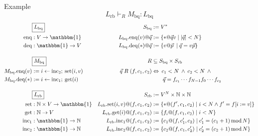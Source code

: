 \documentclass{beamer}
\newcommand{\kw}[1]{\ensuremath{ \mathrm{#1} }}
\begin{document}
\begin{frame}{Example} %
  \vspace{-2em}
  \[ L_\kw{rb} \vdash_R M_\kw{bq} : L_\kw{bq} \]
  \tiny
  \begin{align*}
    & \fbox{$L_\kw{bq}$} &
      S_\kw{bq} &:= V^* \\
    \kw{enq} &: V \rightarrow \mathbbm{1} &
      L_\kw{bq}.\kw{enq}(v)@\vec{q} &:= \{ * @ \vec{q} v \mid |\vec{q}| < N \} \\
    \kw{deq} &: \mathbbm{1} \rightarrow V &
      L_\kw{bq}.\kw{deq}(*)@\vec{q} &:= \{ v @ \vec{p} \: \mid \vec{q} = v \vec{p} \}
    \\[1em]
    & \fbox{$M_\kw{bq}$} &
      R &\subseteq S_\kw{bq} \times S_\kw{rb} \\
    M_\kw{bq}.\kw{enq}(v) &:= i \leftarrow \kw{inc}_2 ; \: \kw{set}(i, v) &
      \vec{q} \mathrel{R} (f, c_1, c_2) &\Leftrightarrow
      \: c_1 < N \:\wedge\: c_2 < N \:\wedge\: {}
    \\
    M_\kw{bq}.\kw{deq}(*) &:= i \leftarrow \kw{inc}_1 ; \: \kw{get}(i) &
      & \qquad \vec{q} = f_{c_1} \cdots f_{N-1} f_0 \cdots f_{c_2}
    \\[1em]
    & \fbox{$L_\kw{rb}$} &
      S_\kw{rb} &:= V^N \times \mathbb{N} \times \mathbb{N}
    \\
    \kw{set} &: \mathbb{N} \times V \rightarrow \mathbbm{1} &
      L_\kw{rb}.\kw{set}(i, v)@(f, c_1, c_2) &:=
      \{ *@(f', c_1, c_2) \mid i < N \wedge f' = f[i := v] \}
    \\
    \kw{get} &: \mathbb{N} \rightarrow V &
      L_\kw{rb}.\kw{get}(i)@(f, c_1, c_2) &:=
      \{ f_i@(f, c_1, c_2) \mid i < N \}
    \\
    \kw{inc}_1 &: \mathbbm{1} \rightarrow \mathbb{N} &
      L_\kw{rb}.\kw{inc}_1@(f, c_1, c_2) &:=
      \{ c_1@(f, c_1', c_2) \mid
         c_1' = (c_1 + 1) \mathop{\mathrm{mod}} N \}
    \\
    \kw{inc}_2 &: \mathbbm{1} \rightarrow \mathbb{N} &
      L_\kw{rb}.\kw{inc}_2@(f, c_1, c_2) &:=
      \{ c_2@(f, c_1, c_2') \mid
         c_2' = (c_2 + 1) \mathop{\mathrm{mod}} N \}
  \end{align*}
\end{frame}
\end{document}
